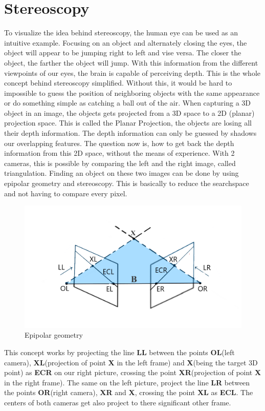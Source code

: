 \documentclass[journal,onecolumn]{IEEEtran}
\begin{document}
\section{Stereoscopy}
\noindent
To visualize the idea behind stereoscopy, the human eye can be used as an intuitive example. Focusing on an object and alternately closing the eyes, the object will appear to be jumping right to left and vise versa. The closer the object, the farther the object will jump. With this information from the different viewpoints of our eyes, the brain is capable of perceiving depth. This is the whole concept behind stereoscopy simplified. Without this, it would be hard to impossible to guess the position of neighboring objects with the same appearance or do something simple as catching a ball out of the air.
When capturing a 3D object in an image, the objects gets projected from a 3D space to a 2D (planar) projection space. This is called the Planar Projection, the objects are losing all their depth information. The depth information can only be guessed by shadows our overlapping features. The question now is, how to get back the depth information from this 2D space, without the means of experience.
With 2 cameras, this is possible by comparing the left and the right image, called triangulation.
Finding an object on these two images can be done by using epipolar geometry and stereoscopy. This is basically to reduce the searchspace and not having to compare every pixel.
\begin{figure}[H]
	\centering
	\includegraphics[scale=0.5]{epipolarGeometry.png}
	\captionsetup{justification=centering}
	\caption{Epipolar geometry}
\end{figure}
\noindent
This concept works by projecting the line {\bf LL} between the points {\bf OL}(left camera), {\bf XL}(projection of point {\bf X} in the left frame) and {\bf X}(being the target 3D point) as {\bf ECR} on our right picture, crossing the point {\bf XR}(projection of point {\bf X} in the right frame). The same on the left picture, project the line {\bf LR} between the points {\bf OR}(right camera), {\bf XR} and {\bf X}, crossing the point {\bf XL} as {\bf ECL}. The centers of both cameras get also project to there significant other frame.
\end{document}
